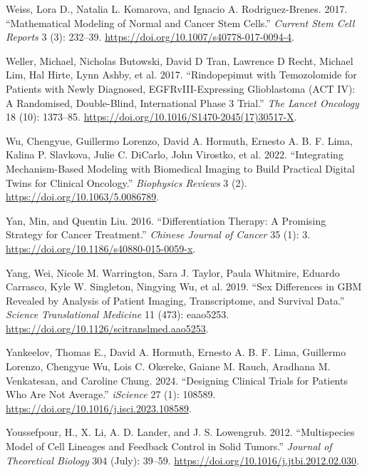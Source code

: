 \documentclass[
  letterpaper,
]{scrreprt}
\newlength{\cslhangindent}
\newenvironment{CSLReferences}[2] %
 {\begin{list}{}{%
  \setlength{\itemindent}{0pt}
  \setlength{\leftmargin}{0pt}
  \setlength{\parsep}{0pt}
  \ifodd #1
   \setlength{\leftmargin}{\cslhangindent}
   \setlength{\itemindent}{-1\cslhangindent}
  \fi
  \setlength{\itemsep}{#2\baselineskip}}}
 {\end{list}}
\theoremstyle{definition}
\theoremstyle{remark}
\begin{document}
\begin{CSLReferences}{1}{0}
Weiss, Lora D., Natalia L. Komarova, and Ignacio A. Rodriguez-Brenes.
2017. {``Mathematical Modeling of Normal and Cancer Stem Cells.''}
\emph{Current Stem Cell Reports} 3 (3): 232--39.
\url{https://doi.org/10.1007/s40778-017-0094-4}.

Weller, Michael, Nicholas Butowski, David D Tran, Lawrence D Recht,
Michael Lim, Hal Hirte, Lynn Ashby, et al. 2017. {``Rindopepimut with
Temozolomide for Patients with Newly Diagnosed, EGFRvIII-Expressing
Glioblastoma (ACT IV): A Randomised, Double-Blind, International Phase 3
Trial.''} \emph{The Lancet Oncology} 18 (10): 1373--85.
\url{https://doi.org/10.1016/S1470-2045(17)30517-X}.

Wu, Chengyue, Guillermo Lorenzo, David A. Hormuth, Ernesto A. B. F.
Lima, Kalina P. Slavkova, Julie C. DiCarlo, John Virostko, et al. 2022.
{``Integrating Mechanism-Based Modeling with Biomedical Imaging to Build
Practical Digital Twins for Clinical Oncology.''} \emph{Biophysics
Reviews} 3 (2). \url{https://doi.org/10.1063/5.0086789}.

Yan, Min, and Quentin Liu. 2016. {``Differentiation Therapy: A Promising
Strategy for Cancer Treatment.''} \emph{Chinese Journal of Cancer} 35
(1): 3. \url{https://doi.org/10.1186/s40880-015-0059-x}.

Yang, Wei, Nicole M. Warrington, Sara J. Taylor, Paula Whitmire, Eduardo
Carrasco, Kyle W. Singleton, Ningying Wu, et al. 2019. {``Sex
Differences in GBM Revealed by Analysis of Patient Imaging,
Transcriptome, and Survival Data.''} \emph{Science Translational
Medicine} 11 (473): eaao5253.
\url{https://doi.org/10.1126/scitranslmed.aao5253}.

Yankeelov, Thomas E., David A. Hormuth, Ernesto A. B. F. Lima, Guillermo
Lorenzo, Chengyue Wu, Lois C. Okereke, Gaiane M. Rauch, Aradhana M.
Venkatesan, and Caroline Chung. 2024. {``Designing Clinical Trials for
Patients Who Are Not Average.''} \emph{iScience} 27 (1): 108589.
\url{https://doi.org/10.1016/j.isci.2023.108589}.

Youssefpour, H., X. Li, A. D. Lander, and J. S. Lowengrub. 2012.
{``Multispecies Model of Cell Lineages and Feedback Control in Solid
Tumors.''} \emph{Journal of Theoretical Biology} 304 (July): 39--59.
\url{https://doi.org/10.1016/j.jtbi.2012.02.030}.


\end{CSLReferences}
\end{document}

